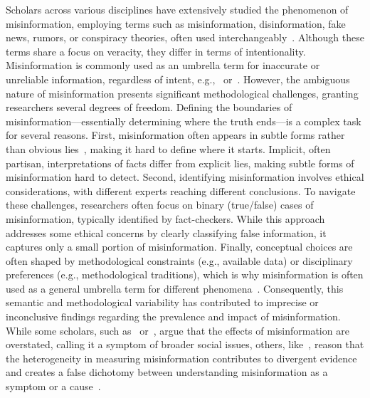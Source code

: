 \documentclass[12pt,twoside]{article}
\begin{document}
Scholars across various disciplines have extensively studied the phenomenon of misinformation, employing terms such as misinformation, disinformation, fake news, rumors, or conspiracy theories, often used interchangeably~\citep{guessMisinformationDisinformationOnline2020}. 
Although these terms share a focus on veracity, they differ in terms of intentionality.
Misinformation is commonly used as an umbrella term for inaccurate or unreliable information, regardless of intent, e.g.,~\cite{eckerPsychologicalDriversMisinformation2022} or~\cite{vanderlindenMisinformationSusceptibilitySpread2022}. 
However, the ambiguous nature of misinformation presents significant methodological challenges, granting researchers several degrees of freedom. 
Defining the boundaries of misinformation––essentially determining where the truth ends––is a complex task for several reasons.
First, misinformation often appears in subtle forms rather than obvious lies~\citep{allenQuantifyingImpactMisinformation2024, altayMisinformationMisinformationConceptual2023a, bakirFakeNewsEconomy2018a, vargoAgendasettingPowerFake2018}, making it hard to define where it starts. 
Implicit, often partisan, interpretations of facts differ from explicit lies, making subtle forms of misinformation hard to detect.
Second, identifying misinformation involves ethical considerations, with different experts reaching different conclusions.
To navigate these challenges, researchers often focus on binary (true/false) cases of misinformation, typically identified by fact-checkers. 
While this approach addresses some ethical concerns by clearly classifying false information, it captures only a small portion of misinformation.
Finally, conceptual choices are often shaped by methodological constraints (e.g., available data) or disciplinary preferences (e.g., methodological traditions), which is why misinformation is often used as a general umbrella term for different phenomena~\citep{weeksWhatNextSix2021}.
Consequently, this semantic and methodological variability has contributed to imprecise or inconclusive findings regarding the prevalence and impact of misinformation. 
While some scholars, such as~\citet{altayMisinformationMisinformationConceptual2023a} or~\citet{budakMisunderstandingHarmsOnline2024a}, argue that the effects of misinformation are overstated, calling it a symptom of broader social issues, others, like~\cite{tayThinkingClearlyMisinformation2024}, reason that the heterogeneity in measuring misinformation contributes to divergent evidence and creates a false dichotomy between understanding misinformation as a symptom or a cause~\citep[also see][]{bozarthHigherGroundHow2020}.
\end{document}
